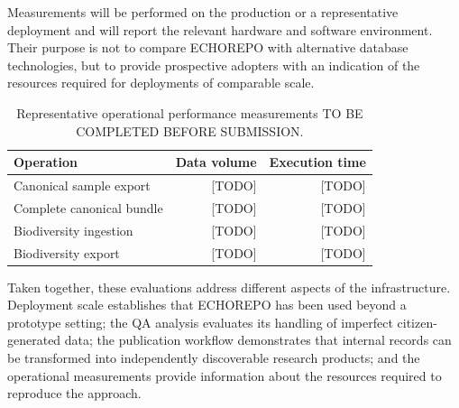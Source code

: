 Measurements will be performed on the production or a representative
deployment and will report the relevant hardware and software environment.
Their purpose is not to compare ECHOREPO with alternative database
technologies, but to provide prospective adopters with an indication of
the resources required for deployments of comparable scale.

\begin{table}[htbp]
    \centering
    \caption{Representative operational performance measurements TO BE COMPLETED BEFORE SUBMISSION.}
    \label{tab:performance}
    \begin{tabular}{lrr}
        \toprule
        Operation & Data volume & Execution time \\
        \midrule
        Canonical sample export & [TODO] & [TODO] \\
        Complete canonical bundle & [TODO] & [TODO] \\
        Biodiversity ingestion & [TODO] & [TODO] \\
        Biodiversity export & [TODO] & [TODO] \\
        \bottomrule
    \end{tabular}
\end{table}

Taken together, these evaluations address different aspects of the
infrastructure. Deployment scale establishes that ECHOREPO has been used
beyond a prototype setting; the QA analysis evaluates its handling of
imperfect citizen-generated data; the publication workflow demonstrates
that internal records can be transformed into independently discoverable
research products; and the operational measurements provide information
about the resources required to reproduce the approach.